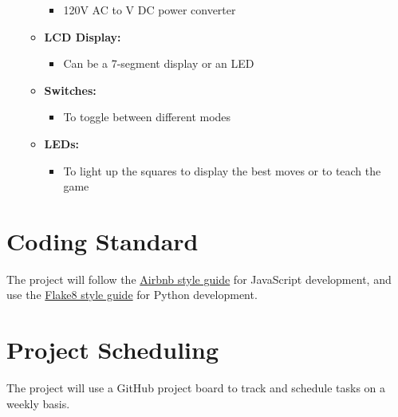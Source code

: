 \documentclass{article}
\begin{document}
\begin{itemize}
\begin{itemize}
\begin{itemize}
        \item 120V AC to V DC power converter
    \end{itemize}
    \item \textbf{LCD Display:}
    \begin{itemize}
        \item Can be a 7-segment display or an LED
    \end{itemize}
    \item \textbf{Switches:}
    \begin{itemize}
        \item To toggle between different modes
    \end{itemize}
    \item \textbf{LEDs:}
    \begin{itemize}
        \item To light up the squares to display the best moves or to teach the game
    \end{itemize}

\end{itemize}
\end{itemize}

\section{Coding Standard}
{The project will follow the \href{https://github.com/airbnb/javascript}{Airbnb style guide} for JavaScript development, and use the \href{https://flake8.pycqa.org/en/latest/}{Flake8 style guide} for Python development.}

\section{Project Scheduling}
{The project will use a GitHub project board to track and schedule tasks on a weekly basis.} 

\medskip
{}

\medskip
{}
\end{document}
